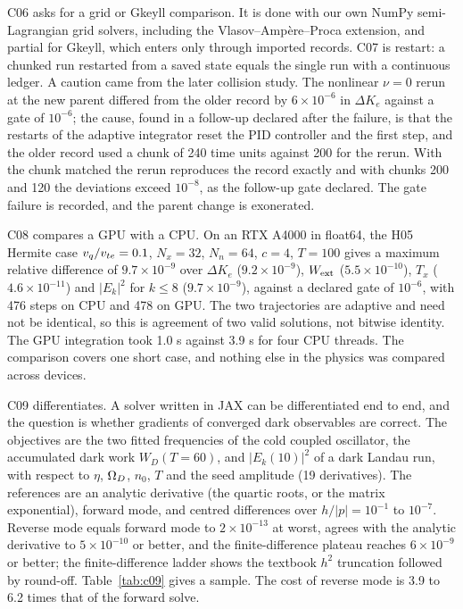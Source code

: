 C06 asks for a grid or Gkeyll comparison. It is done with our own NumPy semi-Lagrangian grid solvers, including the Vlasov--Ampère--Proca extension, and partial for Gkeyll, which enters only through imported records. C07 is restart: a chunked run restarted from a saved state equals the single run with a continuous ledger. A caution came from the later collision study. The nonlinear $\nu=0$ rerun at the new parent differed from the older record by $6\times10^{-6}$ in $\Delta K_e$ against a gate of $10^{-6}$; the cause, found in a follow-up declared after the failure, is that the restarts of the adaptive integrator reset the PID controller and the first step, and the older record used a chunk of 240 time units against 200 for the rerun. With the chunk matched the rerun reproduces the record exactly and with chunks 200 and 120 the deviations exceed $10^{-8}$, as the follow-up gate declared. The gate failure is recorded, and the parent change is exonerated.

C08 compares a GPU with a CPU. On an RTX A4000 in float64, the H05 Hermite case $v_q/v_{te}=0.1$, $N_x=32$, $N_n=64$, $c=4$, $T=100$ gives a maximum relative difference of $9.7\times10^{-9}$ over $\Delta K_e$ ($9.2\times10^{-9}$), $W_{\rm ext}$ ($5.5\times10^{-10}$), $T_x$ ($4.6\times10^{-11}$) and $|E_k|^2$ for $k\le8$ ($9.7\times10^{-9}$), against a declared gate of $10^{-6}$, with 476 steps on CPU and 478 on GPU. The two trajectories are adaptive and need not be identical, so this is agreement of two valid solutions, not bitwise identity. The GPU integration took 1.0 s against 3.9 s for four CPU threads. The comparison covers one short case, and nothing else in the physics was compared across devices.

C09 differentiates. A solver written in JAX can be differentiated end to end, and the question is whether gradients of converged dark observables are correct. The objectives are the two fitted frequencies of the cold coupled oscillator, the accumulated dark work $W_D(T=60)$, and $|E_k(10)|^2$ of a dark Landau run, with respect to $\eta$, $\Omega_D$, $n_0$, $T$ and the seed amplitude (19 derivatives). The references are an analytic derivative (the quartic roots, or the matrix exponential), forward mode, and centred differences over $h/|p|=10^{-1}$ to $10^{-7}$. Reverse mode equals forward mode to $2\times10^{-13}$ at worst, agrees with the analytic derivative to $5\times10^{-10}$ or better, and the finite-difference plateau reaches $6\times10^{-9}$ or better; the finite-difference ladder shows the textbook $h^2$ truncation followed by round-off. Table~\ref{tab:c09} gives a sample. The cost of reverse mode is 3.9 to 6.2 times that of the forward solve.

